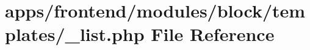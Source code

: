 \hypertarget{frontend_2modules_2block_2templates_2__list_8php}{\section{apps/frontend/modules/block/templates/\-\_\-list.php File Reference}
\label{frontend_2modules_2block_2templates_2__list_8php}
}
